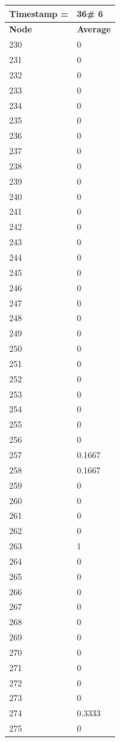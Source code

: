 \begin{tabular}{|l||l|}
\hline
\textbf{Timestamp =} & \textbf{36}\# 6\\\hline
	\textbf{Node} & \textbf{Average} \\ \hline
\hline
	230 & 0 \\ \hline
	231 & 0 \\ \hline
	232 & 0 \\ \hline
	233 & 0 \\ \hline
	234 & 0 \\ \hline
	235 & 0 \\ \hline
	236 & 0 \\ \hline
	237 & 0 \\ \hline
	238 & 0 \\ \hline
	239 & 0 \\ \hline
	240 & 0 \\ \hline
	241 & 0 \\ \hline
	242 & 0 \\ \hline
	243 & 0 \\ \hline
	244 & 0 \\ \hline
	245 & 0 \\ \hline
	246 & 0 \\ \hline
	247 & 0 \\ \hline
	248 & 0 \\ \hline
	249 & 0 \\ \hline
	250 & 0 \\ \hline
	251 & 0 \\ \hline
	252 & 0 \\ \hline
	253 & 0 \\ \hline
	254 & 0 \\ \hline
	255 & 0 \\ \hline
	256 & 0 \\ \hline
	257 & 0.1667 \\ \hline
	258 & 0.1667 \\ \hline
	259 & 0 \\ \hline
	260 & 0 \\ \hline
	261 & 0 \\ \hline
	262 & 0 \\ \hline
	263 & 1 \\ \hline
	264 & 0 \\ \hline
	265 & 0 \\ \hline
	266 & 0 \\ \hline
	267 & 0 \\ \hline
	268 & 0 \\ \hline
	269 & 0 \\ \hline
	270 & 0 \\ \hline
	271 & 0 \\ \hline
	272 & 0 \\ \hline
	273 & 0 \\ \hline
	274 & 0.3333 \\ \hline
	275 & 0 \\ \hline
\end{tabular}

